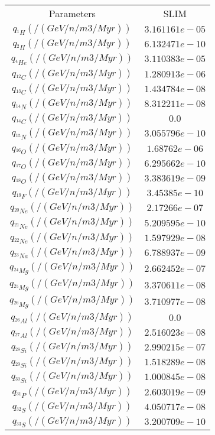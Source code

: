 \begin{tabular}{c |c}
	Parameters & SLIM \\ 
	\cline{1-2}
	$q_{^{1}H} (/(GeV/n/m3/Myr))$ & $3.161161e-05$ \\ 
	$q_{^{2}H} (/(GeV/n/m3/Myr))$ & $6.132471e-10$ \\ 
	$q_{^{4}He} (/(GeV/n/m3/Myr))$ & $3.110383e-05$ \\ 
	$q_{^{12}C} (/(GeV/n/m3/Myr))$ & $1.280913e-06$ \\ 
	$q_{^{13}C} (/(GeV/n/m3/Myr))$ & $1.434784e-08$ \\ 
	$q_{^{14}N} (/(GeV/n/m3/Myr))$ & $8.312211e-08$ \\ 
	$q_{^{14}C} (/(GeV/n/m3/Myr))$ & $0.0$ \\ 
	$q_{^{15}N} (/(GeV/n/m3/Myr))$ & $3.055796e-10$ \\ 
	$q_{^{16}O} (/(GeV/n/m3/Myr))$ & $1.68762e-06$ \\ 
	$q_{^{17}O} (/(GeV/n/m3/Myr))$ & $6.295662e-10$ \\ 
	$q_{^{18}O} (/(GeV/n/m3/Myr))$ & $3.383619e-09$ \\ 
	$q_{^{19}F} (/(GeV/n/m3/Myr))$ & $3.45385e-10$ \\ 
	$q_{^{20}Ne} (/(GeV/n/m3/Myr))$ & $2.17266e-07$ \\ 
	$q_{^{21}Ne} (/(GeV/n/m3/Myr))$ & $5.209595e-10$ \\ 
	$q_{^{22}Ne} (/(GeV/n/m3/Myr))$ & $1.597929e-08$ \\ 
	$q_{^{23}Na} (/(GeV/n/m3/Myr))$ & $6.788937e-09$ \\ 
	$q_{^{24}Mg} (/(GeV/n/m3/Myr))$ & $2.662452e-07$ \\ 
	$q_{^{25}Mg} (/(GeV/n/m3/Myr))$ & $3.370611e-08$ \\ 
	$q_{^{26}Mg} (/(GeV/n/m3/Myr))$ & $3.710977e-08$ \\ 
	$q_{^{26}Al} (/(GeV/n/m3/Myr))$ & $0.0$ \\ 
	$q_{^{27}Al} (/(GeV/n/m3/Myr))$ & $2.516023e-08$ \\ 
	$q_{^{28}Si} (/(GeV/n/m3/Myr))$ & $2.990215e-07$ \\ 
	$q_{^{29}Si} (/(GeV/n/m3/Myr))$ & $1.518289e-08$ \\ 
	$q_{^{30}Si} (/(GeV/n/m3/Myr))$ & $1.000845e-08$ \\ 
	$q_{^{31}P} (/(GeV/n/m3/Myr))$ & $2.603019e-09$ \\ 
	$q_{^{32}S} (/(GeV/n/m3/Myr))$ & $4.050717e-08$ \\ 
	$q_{^{33}S} (/(GeV/n/m3/Myr))$ & $3.200709e-10$ \\ 

\end{tabular}
